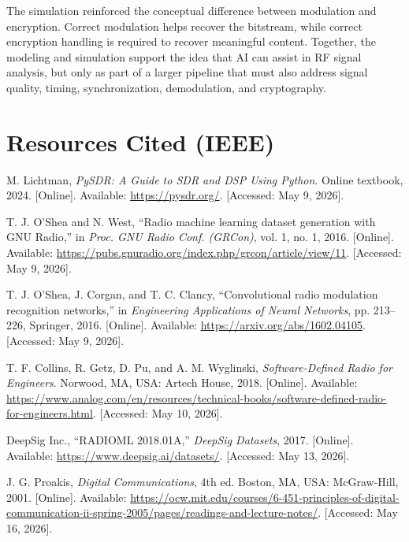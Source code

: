 \documentclass[12pt]{article}
\begin{document}
The simulation reinforced the conceptual difference between modulation and encryption. Correct modulation helps recover the bitstream, while correct encryption handling is required to recover meaningful content. Together, the modeling and simulation support the idea that AI can assist in RF signal analysis, but only as part of a larger pipeline that must also address signal quality, timing, synchronization, demodulation, and cryptography.

\newpage

\section*{Resources Cited (IEEE)}

\begin{enumerate}[label={\textbf{[\arabic*]}},leftmargin=0.55in]
    \item M. Lichtman, \textit{PySDR: A Guide to SDR and DSP Using Python}. Online textbook, 2024. [Online]. Available: \url{https://pysdr.org/}. [Accessed: May 9, 2026].
    \item T. J. O'Shea and N. West, ``Radio machine learning dataset generation with GNU Radio,'' in \textit{Proc. GNU Radio Conf. (GRCon)}, vol. 1, no. 1, 2016. [Online]. Available: \url{https://pubs.gnuradio.org/index.php/grcon/article/view/11}. [Accessed: May 9, 2026].
    \item T. J. O'Shea, J. Corgan, and T. C. Clancy, ``Convolutional radio modulation recognition networks,'' in \textit{Engineering Applications of Neural Networks}, pp. 213--226, Springer, 2016. [Online]. Available: \url{https://arxiv.org/abs/1602.04105}. [Accessed: May 9, 2026].
    \item T. F. Collins, R. Getz, D. Pu, and A. M. Wyglinski, \textit{Software-Defined Radio for Engineers}. Norwood, MA, USA: Artech House, 2018. [Online]. Available: \url{https://www.analog.com/en/resources/technical-books/software-defined-radio-for-engineers.html}. [Accessed: May 10, 2026].
    \item DeepSig Inc., ``RADIOML 2018.01A,'' \textit{DeepSig Datasets}, 2017. [Online]. Available: \url{https://www.deepsig.ai/datasets/}. [Accessed: May 13, 2026].
    \item J. G. Proakis, \textit{Digital Communications}, 4th ed. Boston, MA, USA: McGraw-Hill, 2001. [Online]. Available: \url{https://ocw.mit.edu/courses/6-451-principles-of-digital-communication-ii-spring-2005/pages/readings-and-lecture-notes/}. [Accessed: May 16, 2026].

\end{enumerate}
\end{document}
